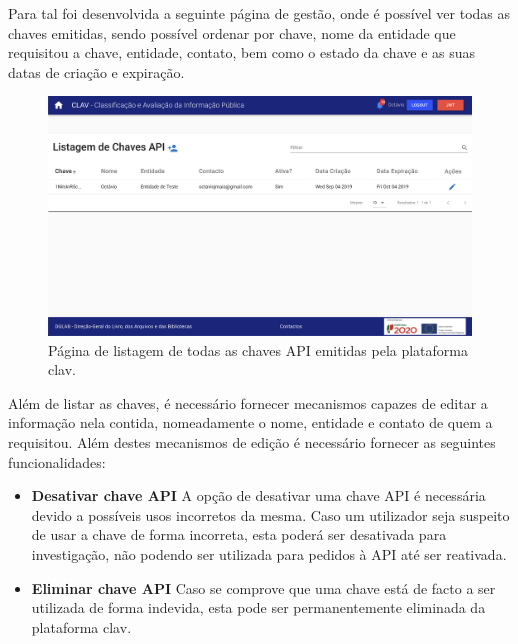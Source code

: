 Para tal foi desenvolvida a seguinte página de gestão, onde é possível ver todas as chaves emitidas, sendo possível ordenar por chave, nome da entidade que requisitou a chave, entidade, contato, bem como o estado da chave e as suas datas de criação e expiração.

\begin{figure}[H]
    \centering
    \includegraphics[width=\textwidth]{img/clav/gestaoAPI/listagemChaves.png}
    \caption{Página de listagem de todas as chaves API emitidas pela plataforma \gls{clav}.}
    \label{fig:listagemChavesAPI}
\end{figure}
\vspace{-1mm}
Além de listar as chaves, é necessário fornecer mecanismos capazes de editar a informação nela contida, nomeadamente o nome, entidade e contato de quem a requisitou. Além destes mecanismos de edição é necessário fornecer as seguintes funcionalidades:

\begin{itemize}
    \item \textbf{Desativar chave API}
    \vspace{-1mm}
    A opção de desativar uma chave API é necessária devido a possíveis usos incorretos da mesma. Caso um utilizador seja suspeito de usar a chave de forma incorreta, esta poderá ser desativada para investigação, não podendo ser utilizada para pedidos à API até ser reativada.
    
    \item \textbf{Eliminar chave API}
    \vspace{-1mm}
    Caso se comprove que uma chave está de facto a ser utilizada de forma indevida, esta pode ser permanentemente eliminada da plataforma \gls{clav}.
\end{itemize}

